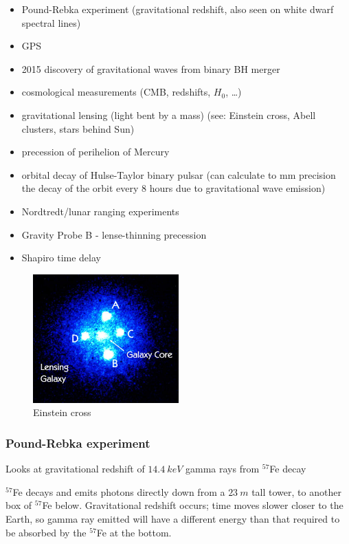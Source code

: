 \documentclass[a4paper]{article} %
\begin{document}
\begin{itemize}
\item Pound-Rebka experiment (gravitational redshift, also seen on white dwarf spectral lines)
\item GPS
\item 2015 discovery of gravitational waves from binary BH merger
\item cosmological measurements (CMB, redshifts, $H_0$, \ldots)
\item gravitational lensing (light bent by a mass) (see: Einstein cross, Abell clusters, stars behind Sun)
\item precession of perihelion of Mercury
\item orbital decay of Hulse-Taylor binary pulsar (can calculate to mm precision the decay of the orbit every 8 hours due to gravitational wave emission)
\item Nordtredt/lunar ranging experiments
\item Gravity Probe B - lense-thinning precession
\item Shapiro time delay
\end{itemize}

\begin{figure}[h]
\centering
\includegraphics[width=0.5\textwidth]{images/einstein-cross.jpg}
\caption{Einstein cross}
\end{figure}


\subsubsection{Pound-Rebka experiment}
Looks at gravitational redshift of $\SI{14.4}{keV}$ gamma rays from $^{57}$Fe decay

$^{57}$Fe decays and emits photons directly down from a $\SI{23}{m}$ tall tower, to another box of $^{57}$Fe below. Gravitational redshift occurs; time moves slower closer to the Earth, so gamma ray emitted will have a different energy than that required to be absorbed by the $^{57}$Fe at the bottom.
\end{document}
